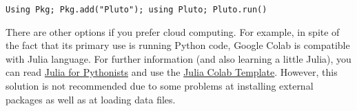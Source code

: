 \vspace{1mm}
\begin{center}
	\texttt{Using Pkg; Pkg.add("Pluto"); using Pluto; Pluto.run()}
\end{center}
\vspace{1mm}

There are other options if you prefer cloud computing. For  example, in spite of the fact that its primary use is running Python code, Google Colab is compatible with Julia language. For further information (and also learning a little Julia), you can read \href{https://colab.research.google.com/github/ageron/julia_notebooks/blob/master/Julia_for_Pythonistas.ipynb#scrollTo=GIeFXS0F0zww}{Julia for Pythonists} and use the \href{https://colab.research.google.com/github/ageron/julia_notebooks/blob/master/Julia_Colab_Notebook_Template.ipynb}{Julia Colab Template}. However, this solution is not recommended due to some problems at installing external packages as well as at loading data files. 

